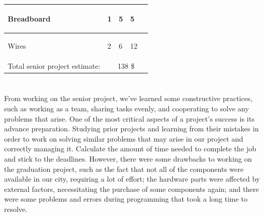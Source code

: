 \documentclass[12pt,a4paper]{report}
\begin{document}
\begin{table}[H]
\begin{center}
\begin{tabular}{|p{6cm}  |p{1cm}  |p{2cm}  |p{1.7cm} |p{3.5cm}|}
\begin{center} Breadboard	    \end{center}  &\begin{center}1 \end{center} & \begin{center} 5 \end{center}	& \begin{center} 5	\end{center}     &	 \\\hline


\begin{center} Wires	    \end{center}  &\begin{center}2 \end{center} & \begin{center} 6 \end{center}	& \begin{center} 12	\end{center}     &	 \\\hline




Total senior project estimate:  &\multicolumn{4}{c|}{138 \$}	\\\hline
\end{tabular}
\end{center}  
\end{table}




\section{\fontsize{12}{12}\selectfont{Lessons Learned}}
From working on the senior project, we've learned some constructive practices, such as working as a team, sharing tasks evenly, and cooperating to solve any problems that arise. One of the most critical aspects of a project's success is its advance preparation. Studying prior projects and learning from their mistakes in order to work on solving similar problems that may arise in our project and correctly managing it. Calculate the amount of time needed to complete the job and stick to the deadlines.
However, there were some drawbacks to working on the graduation project, such as the fact that not all of the components were available in our city, requiring a lot of effort; the hardware parts were affected by external factors, necessitating the purchase of some components again; and there were some problems and errors during programming that took a long time to resolve.
\end{document}
